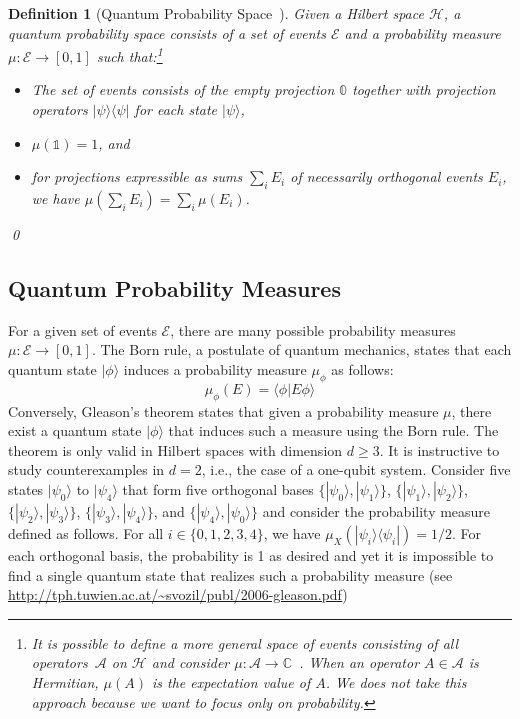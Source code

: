 \documentclass{article}
\theoremstyle{indented}
\newtheorem{definition}{Definition}
\newcommand{\events}{\ensuremath{\mathcal{E}}}
\newcommand{\Hilb}{\mathcal{H}}
\newcommand{\ket}[1]{|#1\rangle}
\newcommand{\ip}[2]{\langle #1 | #2 \rangle}
\newcommand{\proj}[1]{|#1 \rangle\langle #1 |}
\newcommand{\yutsung}[1]{\fbox{\begin{minipage}{0.9\textwidth}\color{purple}{Yu-Tsung says: #1}\end{minipage}}}
\def\C{{\mathbb{C}}}
\theoremstyle{plain}
\theoremstyle{plain}
\begin{document}
\begin{definition}[Quantum Probability Space~\cite{BirkhoffVonNeumann1936,gleason1957,Redhead1987-REDINA,DBLP:journals/corr/abs-0910-2393,Maassen2010}]
  Given a Hilbert space $\Hilb$, a \emph{quantum probability space}
  consists of a set of events $\events$ and a probability measure
  $\mu : \events \rightarrow [0,1]$ such that:\footnote {It is
    possible to define a more general space of events consisting of
    all operators~$\mathcal{A}$ on $\Hilb$ and consider
    $\mu:\mathcal{A}\rightarrow\C$~\cite{Maassen2010,Swart2013}.  When
    an operator $A\in\mathcal{A}$ is Hermitian, $\mu\left(A\right)$ is
    the expectation value of $A$. We does not take this approach
    because we want to focus only on probability. }
\begin{itemize}
\item The set of events consists of the empty projection $\mathbb{0}$
  together with projection operators $\proj{\psi}$ for each state
  $\ket{\psi}$,\\
  \yutsung{and the sum of the orthogonal events recursively.}
\item $\mu(\mathbb{1})=1$, and 
\item for projections expressible as sums $\sum_{i}E_{i}$ of
  necessarily orthogonal events $E_i$, we have
  $\mu\left(\sum_{i}E_{i}\right)=\sum_{i}\mu\left(E_{i}\right)$.
\end{itemize}
\qed\end{definition}

\subsection{Quantum Probability Measures}

For a given set of events $\events$, there are many possible
probability measures $\mu : \events \rightarrow [0,1]$. The Born rule,
a postulate of quantum mechanics, states that each quantum state
$\ket{\phi}$ induces a probability measure $\mu_\phi$ as follows:
\[ 
\mu_\phi(E) = \ip{\phi}{E\phi}
\]
Conversely, Gleason's theorem states that given a probability measure
$\mu$, there exist a quantum state $\ket{\phi}$ that induces such a
measure using the Born rule. The theorem is only valid in Hilbert
spaces with dimension $d \geq 3$. It is instructive to study
counterexamples in $d=2$, i.e., the case of a one-qubit
system. Consider five states $\ket{\psi_0}$ to $\ket{\psi_4}$ that
form five orthogonal bases $\{ \ket{\psi_0}, \ket{\psi_1} \}$,
$\{ \ket{\psi_1}, \ket{\psi_2} \}$,
$\{ \ket{\psi_2}, \ket{\psi_3} \}$,
$\{ \ket{\psi_3}, \ket{\psi_4} \}$, and
$\{ \ket{\psi_4}, \ket{\psi_0} \}$ and consider the probability
measure defined as follows. For all $i \in \{0,1,2,3,4\}$, we have
$\mu_X(\proj{\psi_i}) = 1/2$. For each orthogonal basis, the
probability is 1 as desired and yet it is impossible to find a single
quantum state that realizes such a probability
measure (see \url{http://tph.tuwien.ac.at/~svozil/publ/2006-gleason.pdf})
\end{document}
